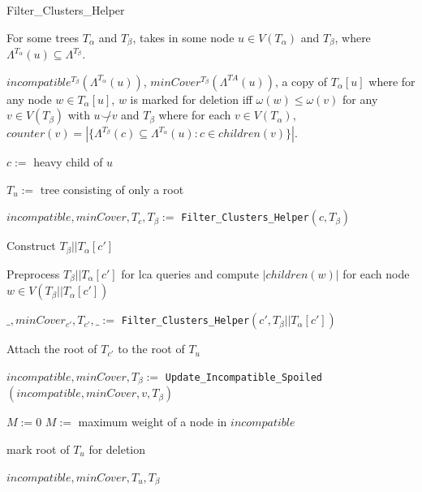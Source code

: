 \documentclass{article}
\newcommand{\compatible}{\smile}
\newcommand{\leafset}{\Lambda}
\newcommand{\weight}{\omega}
\newcommand{\TA}{T_\alpha}
\newcommand{\TB}{T_\beta}
\begin{document}
    \begin{algorithm}
        \caption{Filter\_Clusters\_Helper}
        \label{alg:filterclustershelper}

        \begin{algorithmic}[1]
            \Input For some trees $\TA$ and $\TB$, takes in some node $u \in V(\TA)$ and $\TB$, where $\leafset^{\TA}(u) \subseteq \leafset^{\TB}$.

            \Output $incompatible^{\TB}(\leafset^{\TA}(u))$, $minCover^{\TB}(\leafset^{TA}(u))$, a copy of $\TA[u]$ where for any node $w \in \TA[u]$, $w$ is marked for deletion iff $\weight(w) \leq \weight(v)$ for any $v \in V(\TB)$ with $u \not\compatible v$ and $\TB$ where for each $v \in V(\TA)$, $counter(v) = |\{\leafset^{\TB}(c) \subseteq \leafset^{\TA}(u) : c \in children(v)\}|$.

            \State $c := $ heavy child of $u$

            \State $T_u :=$ tree consisting of only a root

            \State $incompatible, minCover, T_{c}, \TB :=$ \texttt{Filter\_Clusters\_Helper}$(c, \TB)$

                \State Construct $\TB||\TA[c']$

                \State Preprocess $\TB||\TA[c']$ for lca queries and compute $|children(w)|$ for each node $w \in V(\TB||\TA[c'])$

                \State $\_, minCover_{c'}, T_{c'}, \_ :=$ \texttt{Filter\_Clusters\_Helper}$(c', \TB||\TA[c'])$

                \State Attach the root of $T_{c'}$ to the root of $T_u$

                    \State $incompatible, minCover, \TB :=$ \texttt{Update\_Incompatible\_Spoiled}$(incompatible, minCover, v, \TB)$
                \EndFor
            \EndFor

                {$M := 0$}
                $M :=$ maximum weight of a node in $incompatible$

            \IIf{$\weight(u) \leq M$}
                mark root of $T_u$ for deletion

            \State \Return $incompatible, minCover, T_u, \TB$
        \end{algorithmic}
    \end{algorithm}
\end{document}
